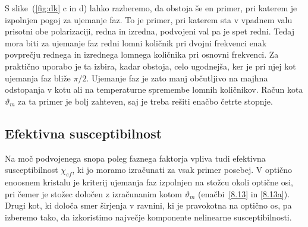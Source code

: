 S slike~(\ref{fig:dk} c in d) lahko razberemo, da obstoja še en primer, pri 
katerem je izpolnjen pogoj za ujemanje faz. To je primer, pri katerem sta v vpadnem
valu prisotni obe polarizaciji, redna in izredna, podvojeni val pa
je spet redni. Tedaj mora biti za ujemanje faz redni lomni količnik
pri dvojni frekvenci enak povprečju rednega in izrednega lomnega količnika
pri osnovni frekvenci. Za praktično uporabo je ta izbira, kadar obstoja,
celo ugodnejša, ker je pri njej kot ujemanja faz bliže $\pi/2$. 
Ujemanje faz je zato manj občutljivo na majhna odstopanja v kotu ali na temperaturne
spremembe lomnih količnikov. Račun kota $\vartheta_m$ za ta primer je
bolj zahteven, saj je treba rešiti enačbo četrte stopnje.

\subsection*{Efektivna susceptibilnost}
Na moč podvojenega snopa poleg faznega faktorja vpliva tudi efektivna 
susceptibilnost $\chi_{ef}$, ki jo moramo izračunati za vsak primer posebej. 
V optično enoosnem kristalu
je kriterij ujemanja faz izpolnjen na stožcu okoli optične osi, pri čemer je stožec določen 
z izračunanim kotom $\vartheta_m$ (enačbi~\ref{8.13} in \ref{8.13a}). 
Drugi kot, ki določa smer širjenja v ravnini, ki je pravokotna na optično os, pa 
izberemo tako, da izkoristimo največje komponente nelinearne 
susceptibilnosti. 

